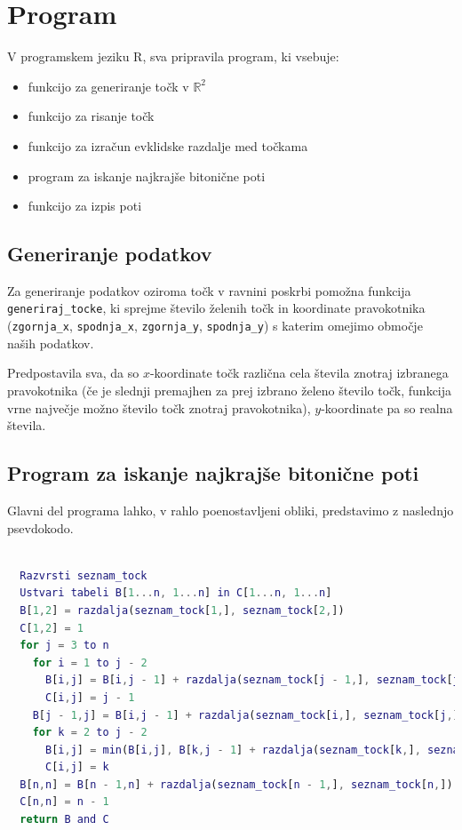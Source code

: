 \documentclass[12pt,a4paper]{amsart}
\theoremstyle{definition}
\theoremstyle{plain}
\newcommand{\R}{\mathbb R}
\begin{document}
\section{Program}

\noindent
V programskem jeziku R, sva pripravila program, ki vsebuje:

\begin{itemize}
  \item funkcijo za generiranje točk v $\R^2$
  \item funkcijo za risanje točk
  \item funkcijo za izračun evklidske razdalje med točkama
  \item program za iskanje najkrajše bitonične poti
  \item funkcijo za izpis poti
  \newline

\end{itemize}

\subsection{Generiranje podatkov}

\noindent
Za generiranje podatkov oziroma točk v ravnini poskrbi pomožna funkcija \texttt{generiraj\_tocke}, ki sprejme
število želenih točk in koordinate pravokotnika (\texttt{zgornja\_x}, \texttt{spodnja\_x}, \texttt{zgornja\_y},
\texttt{spodnja\_y}) s katerim omejimo območje naših podatkov. 
\newline

\noindent
Predpostavila sva, da so $x$-koordinate točk
različna cela števila znotraj izbranega pravokotnika (če je slednji premajhen za prej izbrano želeno število
točk, funkcija vrne največje možno število točk znotraj pravokotnika), $y$-koordinate pa so realna števila.
\newline

\subsection{Program za iskanje najkrajše bitonične poti}

\noindent
Glavni del programa lahko, v rahlo poenostavljeni obliki, predstavimo z naslednjo
psevdokodo.
\newline

\begin{lstlisting}[basicstyle=\tiny, language=Matlab]

  Razvrsti seznam_tock
  Ustvari tabeli B[1...n, 1...n] in C[1...n, 1...n]
  B[1,2] = razdalja(seznam_tock[1,], seznam_tock[2,])
  C[1,2] = 1
  for j = 3 to n
    for i = 1 to j - 2
      B[i,j] = B[i,j - 1] + razdalja(seznam_tock[j - 1,], seznam_tock[j,])
      C[i,j] = j - 1
    B[j - 1,j] = B[i,j - 1] + razdalja(seznam_tock[i,], seznam_tock[j,])
    for k = 2 to j - 2
      B[i,j] = min(B[i,j], B[k,j - 1] + razdalja(seznam_tock[k,], seznam_tock[j,]))
      C[i,j] = k
  B[n,n] = B[n - 1,n] + razdalja(seznam_tock[n - 1,], seznam_tock[n,])
  C[n,n] = n - 1
  return B and C

\end{lstlisting}
\end{document}
